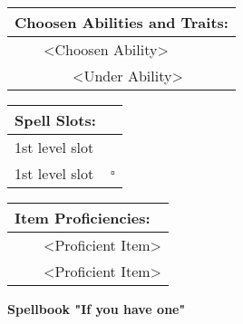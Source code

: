 \documentclass[11pt]{article}
\newcommand{\done}{\rlap{$\square$}{\raisebox{2pt}{\large\hspace{1pt}\ding{51}}}}
\newcommand{\available}{$\square$}
\newcommand{\tabitem}{~~\llap{--}~~}
\newcommand{\tabtabitem}{~~~~~~\llap{$\bullet$}~~}
\begin{document}
\begin{multicols}{2}
\vspace{4mm}

\noindent \begin{tabularx}{95mm}{@{}l}
{\Large \textbf{Choosen Abilities and Traits:}} \\
\hline
\tabitem <Choosen Ability> \\
\tabtabitem <Under Ability>
		\end{tabularx}

\vspace{4mm}

\noindent \begin{tabularx}{95mm}{@{}l c}
{\Large \textbf{Spell Slots:}} \\
\hline
1st level slot & \done \\
1st level slot & \available
		\end{tabularx}

\vspace{4mm}

\noindent \begin{tabularx}{95mm}{@{}l}
{\Large \textbf{Item Proficiencies:}} \\
\hline
\tabitem <Proficient Item> \\
\tabitem <Proficient Item>
		\end{tabularx}
	\end{multicols}

\clearpage

	\begin{center}
{\LARGE \textbf{Spellbook "If you have one"}}
	\end{center}
\end{document}
